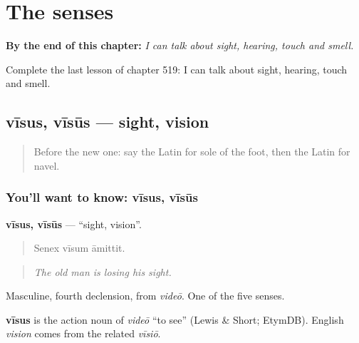 
\chapter{The senses}
\label{ch:la-the-senses}

\begin{chapteropening}
\textbf{By the end of this chapter:} \emph{I can talk about sight, hearing, touch and smell.}

Complete the last lesson of chapter 519: I can talk about sight, hearing, touch and smell.
\end{chapteropening}

\section[vīsus, vīsūs]{vīsus, vīsūs — sight, vision}

\label{lesson:LA-C519-visus}



\begin{quote}
Before the new one: say the Latin for sole of the foot, then the Latin for navel.
\end{quote}

\subsection*{You'll want to know: vīsus, vīsūs}
\textbf{vīsus, vīsūs} — \textquotedblleft{}sight, vision\textquotedblright{}.

\begin{quote}
Senex vīsum āmittit.
\end{quote}

\begin{quote}
\emph{The old man is losing his sight.}
\end{quote}

Masculine, fourth declension, from \emph{videō}. One of the five senses.

\begin{cousinweb}
\textbf{vīsus} is the action noun of \emph{videō} \textquotedblleft{}to see\textquotedblright{} (Lewis \& Short; EtymDB). English \emph{vision} comes from the related \emph{vīsiō}.
\end{cousinweb}

